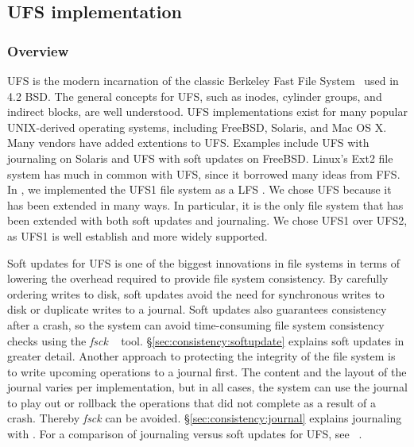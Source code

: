 \subsection{UFS implementation}
\label{sec:modules:ufs}

\subsubsection {Overview}
UFS is the modern incarnation of the classic Berkeley Fast File
System~\cite{mckusick84fast} used in 4.2 BSD. The general concepts for UFS,
such as inodes, cylinder groups, and indirect blocks, are well understood. UFS
implementations exist for many popular UNIX-derived operating systems,
including FreeBSD, Solaris, and Mac OS X. Many vendors have added extentions to
UFS. Examples include UFS with journaling on Solaris and UFS with soft updates
on FreeBSD. Linux's Ext2 file system has much in common with UFS, since it
borrowed many ideas from FFS. In \Kudos, we implemented the UFS1 file system as
a LFS \module. We chose UFS because it has been extended in many ways. In
particular, it is the only file system that has been extended with both soft
updates and journaling. We chose UFS1 over UFS2, as UFS1 is well establish and
more widely
supported.

Soft updates for UFS is one of the biggest innovations in file systems in terms
of lowering the overhead required to provide file system consistency. By
carefully ordering writes to disk, soft updates avoid the need for synchronous
writes to disk or duplicate writes to a journal. Soft updates also guarantees
consistency after a crash, so the system can avoid time-consuming file system
consistency checks using the \emph{fsck} ~\cite{mckusick94fsck} tool.
\S\ref{sec:consistency:softupdate} explains soft updates in greater detail.
Another approach to protecting the integrity of the file system is to write
upcoming operations to a journal first. The content and the layout of the
journal varies per implementation, but in all cases, the system can use the
journal to play out or rollback the operations that did not complete as a
result of a crash. Thereby \emph{fsck} can be avoided.
\S\ref{sec:consistency:journal} explains journaling with \chdescs. For a
comparison of journaling versus soft updates for UFS, see
~\cite{seltzer00journaling}.

